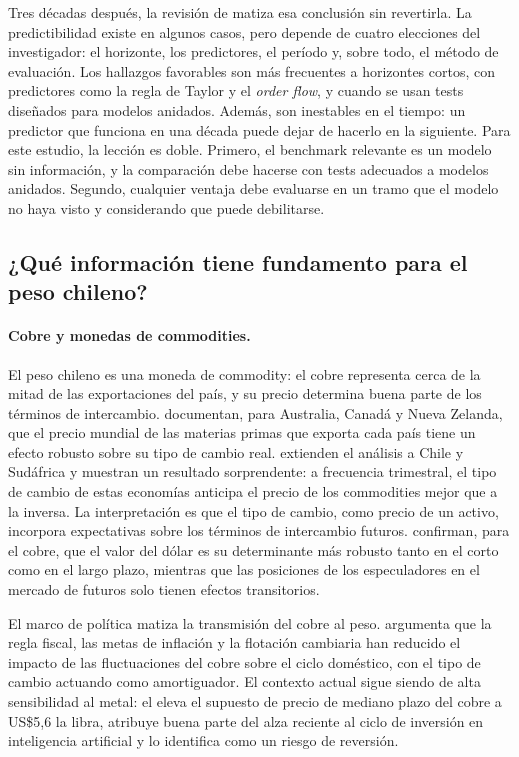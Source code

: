 \documentclass[11pt,a4paper]{article}
\begin{document}
Tres décadas después, la revisión de \citet{rossi2013} matiza esa conclusión sin revertirla. La predictibilidad existe en algunos casos, pero depende de cuatro elecciones del investigador: el horizonte, los predictores, el período y, sobre todo, el método de evaluación. Los hallazgos favorables son más frecuentes a horizontes cortos, con predictores como la regla de Taylor y el \emph{order flow}, y cuando se usan tests diseñados para modelos anidados. Además, son inestables en el tiempo: un predictor que funciona en una década puede dejar de hacerlo en la siguiente. Para este estudio, la lección es doble. Primero, el benchmark relevante es un modelo sin información, y la comparación debe hacerse con tests adecuados a modelos anidados. Segundo, cualquier ventaja debe evaluarse en un tramo que el modelo no haya visto y considerando que puede debilitarse.

\subsection{¿Qué información tiene fundamento para el peso chileno?}

\paragraph{Cobre y monedas de commodities.} El peso chileno es una moneda de commodity: el cobre representa cerca de la mitad de las exportaciones del país, y su precio determina buena parte de los términos de intercambio. \citet{chen2003} documentan, para Australia, Canadá y Nueva Zelanda, que el precio mundial de las materias primas que exporta cada país tiene un efecto robusto sobre su tipo de cambio real. \citet{chen2010} extienden el análisis a Chile y Sudáfrica y muestran un resultado sorprendente: a frecuencia trimestral, el tipo de cambio de estas economías anticipa el precio de los commodities mejor que a la inversa. La interpretación es que el tipo de cambio, como precio de un activo, incorpora expectativas sobre los términos de intercambio futuros. \citet{jaramillo2006} confirman, para el cobre, que el valor del dólar es su determinante más robusto tanto en el corto como en el largo plazo, mientras que las posiciones de los especuladores en el mercado de futuros solo tienen efectos transitorios.

El marco de política matiza la transmisión del cobre al peso. \citet{degregorio2009} argumenta que la regla fiscal, las metas de inflación y la flotación cambiaria han reducido el impacto de las fluctuaciones del cobre sobre el ciclo doméstico, con el tipo de cambio actuando como amortiguador. El contexto actual sigue siendo de alta sensibilidad al metal: el \citet{ipom2026} eleva el supuesto de precio de mediano plazo del cobre a US\$5,6 la libra, atribuye buena parte del alza reciente al ciclo de inversión en inteligencia artificial y lo identifica como un riesgo de reversión.
\end{document}
